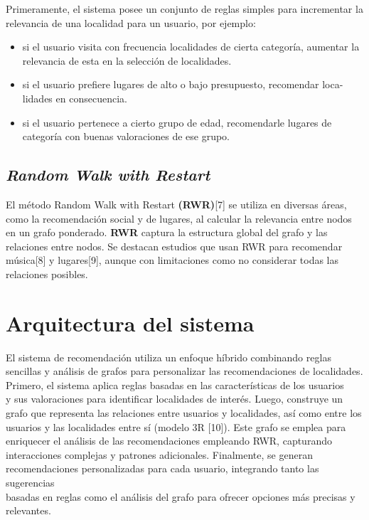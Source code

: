 \documentclass[runningheads]{llncs}
\begin{document}
Primeramente, el sistema posee un conjunto de reglas simples para incrementar la relevancia de una localidad para un usuario, por ejemplo: 

\begin{itemize}[left=1.3em]
    \item si el usuario visita con frecuencia localidades de cierta categoría, aumentar la relevancia de esta en la selección de localidades.
    \item si el usuario prefiere lugares de alto o bajo presupuesto,  recomendar loca- \\ lidades en consecuencia.
    \item si el usuario pertenece a cierto grupo de edad, recomendarle lugares de categoría con buenas valoraciones de ese grupo.
\end{itemize}

\subsection{\textit{Random Walk with Restart}}
El método Random Walk with Restart \textbf{(RWR)}[7] se utiliza en diversas áreas, como la recomendación social y de lugares, al calcular la relevancia entre nodos en un grafo ponderado. \textbf{RWR} captura la estructura global del grafo y las relaciones entre nodos. Se destacan estudios que usan RWR para recomendar música[8] y lugares[9], aunque con limitaciones como no considerar todas las relaciones posibles. 

\section{Arquitectura del sistema}
El sistema de recomendación utiliza un enfoque híbrido combinando reglas sencillas y análisis de grafos para personalizar las recomendaciones de localidades. Primero, el sistema aplica reglas basadas en las características de los usuarios \\ y sus valoraciones para identificar localidades de interés. Luego, construye un grafo que representa las relaciones entre usuarios y localidades, así como entre los usuarios y las localidades entre sí (modelo 3R [10]). Este grafo se emplea para enriquecer el análisis de las recomendaciones empleando RWR, capturando interacciones complejas y patrones adicionales. Finalmente, se generan recomendaciones personalizadas para cada usuario, integrando tanto las sugerencias \\  basadas en reglas como el análisis del grafo para ofrecer opciones más precisas y relevantes.
\end{document}
